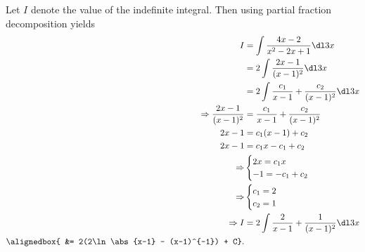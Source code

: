 \documentclass[
  coursecode={APSC 171},
  assignmentname={Week 9 Material Tutorial Solutions},
  solutiontitle=Solution,
  nodate,
  draft,
]{
  ltxanswer%
}
\begin{document}
\begin{questions}
\begin{solution}
      Let \(I\) denote the value of the indefinite integral. Then using partial fraction decomposition yields
      \begin{align*}
        I                                  &= \int \frac{4x-2}{x^{2}-2x+1} \dl3{x}                       \\
                                           &= 2 \int \frac{2x-1}{(x-1)^{2}} \dl3{x}                      \\
                                           &= 2 \int \frac{c_{1}}{x-1} + \frac{c_{2}}{(x-1)^{2}} \dl3{x} \\
        \Rightarrow \frac{2x-1}{(x-1)^{2}} &= \frac{c_{1}}{x-1} + \frac{c_{2}}{(x-1)^{2}}                \\
        2x-1                               &= c_{1}(x-1) + c_{2}                                         \\
        2x-1                               &= c_{1}x - c_{1} + c_{2}                                     \\
        \Rightarrow                        &\begin{cases}
                                              2x = c_{1}x \\
                                              -1 = -c_{1} + c_{2}
                                            \end{cases}                                           \\
        \Rightarrow                        &\begin{cases}
                                              c_{1} = 2 \\
                                              c_{2} = 1
                                            \end{cases}                                                 \\
        \Rightarrow I                      &= 2 \int \frac{2}{x-1} + \frac{1}{(x-1)^{2}} \dl3{x}         \\
        \alignedbox{                       &= 2(2\ln\abs{x-1} - (x-1)^{-1}) + C}.
      \end{align*}
    \end{solution}
  \end{questions}
\end{document}
